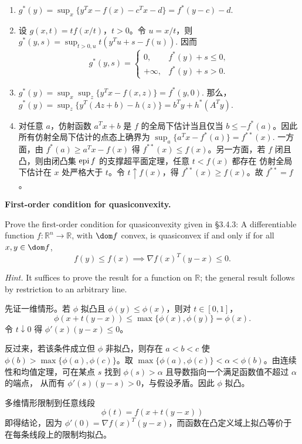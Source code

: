 \documentclass{ctexart}
\begin{document}
\begin{solution}
  \begin{enumerate}
    \item
      \(
        g^*(y)=\sup_x\{y^Tx-f(x)-c^Tx-d\}=f^*(y-c)-d.
      \)

    \item 设 $g(x,t)=tf(x/t)$，$t>0$。令 $u=x/t$，则
      \(
        g^*(y,s)=\sup_{t>0,u}t(y^Tu+s-f(u)).
      \)
      因而
      \[
        g^*(y,s)=
        \begin{cases}
          0,& f^*(y)+s\leq0,\\
          +\infty,& f^*(y)+s>0.
        \end{cases}
      \]

    \item
      \(
        g^*(y)=\sup_x\sup_z\{y^Tx-f(x,z)\}=f^*(y,0).
      \)
      那么，
      \(
        g^*(y)=\sup_z\{y^T(Az+b)-h(z)\}=b^Ty+h^*(A^Ty).
      \)

    \item 对任意 $a$，仿射函数 $a^Tx+b$ 是 $f$ 的全局下估计当且仅当
      $b\leq -f^*(a)$。因此所有仿射全局下估计的点态上确界为
      \(
        \sup_a\{a^Tx-f^*(a)\}=f^{**}(x).
      \)
      一方面，由 $f^*(a)\geq a^Tx-f(x)$ 得 $f^{**}(x)\leq f(x)$。另一方面，若
      $f$ 闭且凸，则由闭凸集 $\operatorname{epi} f$ 的支撑超平面定理，任意 $t<f(x)$ 都存在
      仿射全局下估计在 $x$ 处严格大于 $t$。令 $t\uparrow f(x)$，得
      $f^{**}(x)\geq f(x)$。故 $f^{**}=f$。
  \end{enumerate}
\end{solution}

\begin{problem}\label{3.43}
  \textbf{First-order condition for quasiconvexity.}

  Prove the first-order condition for quasiconvexity given in \S3.4.3:
  A differentiable function $f:\mathbb{R}^n\to\mathbb{R}$, with $\dom f$ convex, is
  quasiconvex if and only if for all $x,y\in\dom f$,
  \[
    f(y)\leq f(x)\implies\nabla f(x)^T(y-x)\leq0.
  \]

  \textit{Hint.} It suffices to prove the result for a function on $\mathbb{R}$; the
  general result follows by restriction to an arbitrary line.
\end{problem}

\begin{solution}
  先证一维情形。若 $\phi$ 拟凸且 $\phi(y)\leq\phi(x)$，则对 $t\in[0,1]$，
  \[
    \phi(x+t(y-x))\leq\max\{\phi(x),\phi(y)\}=\phi(x).
  \]
  令 $t\downarrow0$ 得 $\phi'(x)(y-x)\leq0$。

  反过来，若该条件成立但 $\phi$ 非拟凸，则存在 $a<b<c$ 使
  $\phi(b)>\max\{\phi(a),\phi(c)\}$。取
  $\max\{\phi(a),\phi(c)\}<\alpha<\phi(b)$。由连续性和均值定理，可在某点
  $s$ 找到 $\phi(s)>\alpha$ 且导数指向一个满足函数值不超过 $\alpha$ 的端点，
  从而有 $\phi'(s)(y-s)>0$，与假设矛盾。因此 $\phi$ 拟凸。

  多维情形限制到任意线段
  \[
    \phi(t)=f(x+t(y-x))
  \]
  即得结论，因为 $\phi'(0)=\nabla f(x)^T(y-x)$，而函数在凸定义域上拟凸等价于
  在每条线段上的限制均拟凸。
\end{solution}
\end{document}
